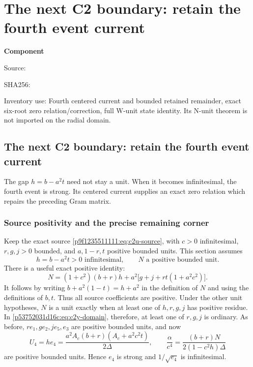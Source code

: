 \chapter{The next C2 boundary: retain the fourth event current}
\label{component:p53752031d16c}
\noindent\textbf{Component }\par
{\small\noindent Source: \par}
{\small\noindent SHA256: \par}
{\small\noindent Inventory use: Fourth centered current and bounded retained remainder, exact six-root zero relation/correction, full W-unit state identity. Its N-unit theorem is not imported on the radial domain.\par}
\medskip
\section{The next C2 boundary: retain the fourth event current}
\label{p53752031d16c:sec:c2-y-current}

The gap $h=b-a^2t$ need not stay a unit.  When it becomes
infinitesimal, the fourth event is strong.  Its centered current supplies
an exact zero relation which repairs the preceding Gram matrix.

\subsection{Source positivity and the precise remaining corner}
Keep the exact source \eqref{p9f1235511111:eq:c2u-source}, with $c>0$ infinitesimal,
$r,g,j>0$ bounded, and $a,1-r,t$ positive bounded units.  This section
assumes
\begin{equation}
h=b-a^2t>0\text{ infinitesimal},\qquad N\text{ a positive bounded unit}.
\label{p53752031d16c:eq:c2y-domain}
\end{equation}
There is a useful exact positive identity:
\begin{equation}
N=(1+c^2)(b+r)h+a^2\bigl[g+j+rt(1+a^2c^2)\bigr].
\label{p53752031d16c:eq:c2y-N-positive}
\end{equation}
It follows by writing $b+a^2(1-t)=h+a^2$ in the definition of $N$
and using the definitions of $b,t$.  Thus all source coefficients are
positive.  Under the other unit hypotheses, $N$ is a unit exactly when
at least one of $h,r,g,j$ has positive residue.  In
\eqref{p53752031d16c:eq:c2y-domain}, therefore, at least one of $r,g,j$ is ordinary.
As before, $re_1,ge_2,je_5,e_3$ are positive bounded units, and now
\begin{equation}
U_4=he_4=\frac{a^2A_c(b+r)(A_c+a^2c^2t)}{2\Delta},\qquad
\frac{\alpha}{c^4}=\frac{(b+r)N}{2(1-c^2h)\Delta}
\label{p53752031d16c:eq:c2y-units}
\end{equation}
are positive bounded units.  Hence $e_4$ is strong and
$1/\sqrt{e_4}$ is infinitesimal.

